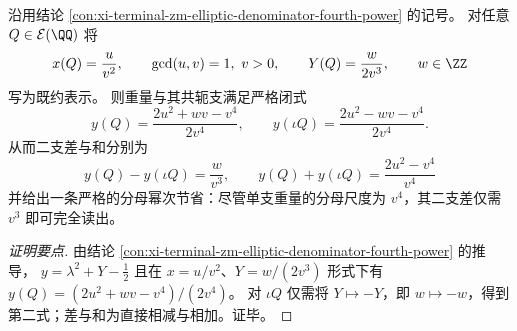 \begin{conclusion}\label{con:xi-terminal-zm-elliptic-weight-branch-difference-v3}
沿用结论 \ref{con:xi-terminal-zm-elliptic-denominator-fourth-power} 的记号。
对任意 \(Q\in\mathcal{E}(\QQ)\) 将
\[
x(Q)=\frac{u}{v^{2}},\qquad \gcd(u,v)=1,\ v>0,
\qquad
Y(Q)=\frac{w}{2v^{3}},\qquad w\in\ZZ
\]
写为既约表示。
则重量与其共轭支满足严格闭式
\[
y(Q)=\frac{2u^{2}+wv-v^{4}}{2v^{4}},
\qquad
y(\iota Q)=\frac{2u^{2}-wv-v^{4}}{2v^{4}}.
\]
从而二支差与和分别为
\[
\boxed{\;
y(Q)-y(\iota Q)=\frac{w}{v^{3}},\qquad
y(Q)+y(\iota Q)=\frac{2u^{2}-v^{4}}{v^{4}}\;}
\]
并给出一条严格的分母幂次节省：尽管单支重量的分母尺度为 \(v^{4}\)，其二支差仅需 \(v^{3}\) 即可完全读出。
\end{conclusion}
\begin{proof}[证明要点]
由结论 \ref{con:xi-terminal-zm-elliptic-denominator-fourth-power} 的推导，
\(
y=\lambda^{2}+Y-\tfrac12
\)
且在 \(x=u/v^{2}\)、\(Y=w/(2v^{3})\) 形式下有
\(
y(Q)=(2u^{2}+wv-v^{4})/(2v^{4})
\)。
对 \(\iota Q\) 仅需将 \(Y\mapsto -Y\)，即 \(w\mapsto -w\)，得到第二式；差与和为直接相减与相加。证毕。
\end{proof}

